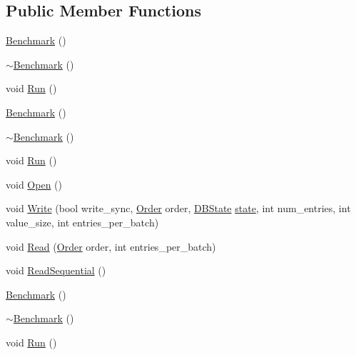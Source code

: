 \subsection*{Public Member Functions}
\begin{DoxyCompactItemize}
\item 
\hyperlink{classleveldb_1_1_benchmark_a05d001d05283f6d1d589d417b42aa736}{Benchmark} ()
\item 
\hyperlink{classleveldb_1_1_benchmark_a32bd4ebe6df5e4f664a944d71b066bd5}{$\sim$\-Benchmark} ()
\item 
void \hyperlink{classleveldb_1_1_benchmark_a2f262afa0c7d10fcf531fe9657fba490}{Run} ()
\item 
\hyperlink{classleveldb_1_1_benchmark_a05d001d05283f6d1d589d417b42aa736}{Benchmark} ()
\item 
\hyperlink{classleveldb_1_1_benchmark_a32bd4ebe6df5e4f664a944d71b066bd5}{$\sim$\-Benchmark} ()
\item 
void \hyperlink{classleveldb_1_1_benchmark_a2f262afa0c7d10fcf531fe9657fba490}{Run} ()
\item 
void \hyperlink{classleveldb_1_1_benchmark_a89a3b0da75e6cd2ffb879358e5dd82a6}{Open} ()
\item 
void \hyperlink{classleveldb_1_1_benchmark_a86876b2882d9015610330e69acfdff0d}{Write} (bool write\-\_\-sync, \hyperlink{classleveldb_1_1_benchmark_a4694fe0f2fd06d7da386305a339ddbc4}{Order} order, \hyperlink{classleveldb_1_1_benchmark_ad94bd817d74359a4d8cea6da609a28d4}{D\-B\-State} \hyperlink{version__set_8cc_a6aad002d0db5e5e85dc31927a5a6f503}{state}, int num\-\_\-entries, int value\-\_\-size, int entries\-\_\-per\-\_\-batch)
\item 
void \hyperlink{classleveldb_1_1_benchmark_afc9cf258a63488924e172fadc67c12f1}{Read} (\hyperlink{classleveldb_1_1_benchmark_a4694fe0f2fd06d7da386305a339ddbc4}{Order} order, int entries\-\_\-per\-\_\-batch)
\item 
void \hyperlink{classleveldb_1_1_benchmark_a301897d0609459c5e6072db05da6b737}{Read\-Sequential} ()
\item 
\hyperlink{classleveldb_1_1_benchmark_a05d001d05283f6d1d589d417b42aa736}{Benchmark} ()
\item 
\hyperlink{classleveldb_1_1_benchmark_a32bd4ebe6df5e4f664a944d71b066bd5}{$\sim$\-Benchmark} ()
\item 
void \hyperlink{classleveldb_1_1_benchmark_a2f262afa0c7d10fcf531fe9657fba490}{Run} ()
\end{DoxyCompactItemize}
